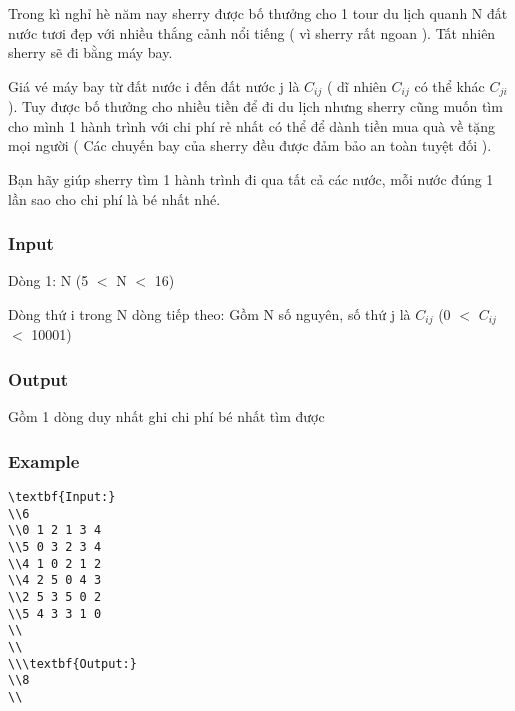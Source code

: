 



   Trong kì nghỉ hè năm nay sherry được bố thưởng cho 1 tour du lịch quanh N đất nước tươi đẹp với nhiều thắng cảnh nổi tiếng ( vì sherry rất ngoan ). Tất nhiên sherry sẽ đi bằng máy bay.  

   Giá vé máy bay từ đất nước i đến đất nước j là $C_{ij}$   ( dĩ nhiên $C_{ij}$   có thể khác $C_{ji}$   ). Tuy được bố thưởng cho nhiều tiền để đi du lịch nhưng sherry cũng muốn tìm cho mình 1 hành trình với chi phí rẻ nhất có thể để dành tiền mua quà về tặng mọi người  ( Các chuyến bay của sherry đều được đảm bảo an toàn tuyệt đối ).  

   Bạn hãy giúp sherry tìm 1 hành trình đi qua tất cả các nước, mỗi nước đúng 1 lần sao cho chi phí là bé nhất nhé.  

\subsubsection{   Input  }

   Dòng 1: N (5 $<$ N $<$ 16)  

   Dòng thứ i trong N dòng tiếp theo: Gồm N số nguyên, số thứ j là $C_{ij}$   (0 $<$ $C_{ij}$   $<$ 10001)  

\subsubsection{   Output  }

   Gồm 1 dòng duy nhất ghi chi phí bé nhất tìm được  

\subsubsection{   Example  }
\begin{verbatim}
\textbf{Input:}
\\6
\\0 1 2 1 3 4 
\\5 0 3 2 3 4 
\\4 1 0 2 1 2 
\\4 2 5 0 4 3 
\\2 5 3 5 0 2 
\\5 4 3 3 1 0 
\\
\\
\\\textbf{Output:}
\\8
\\\end{verbatim}
